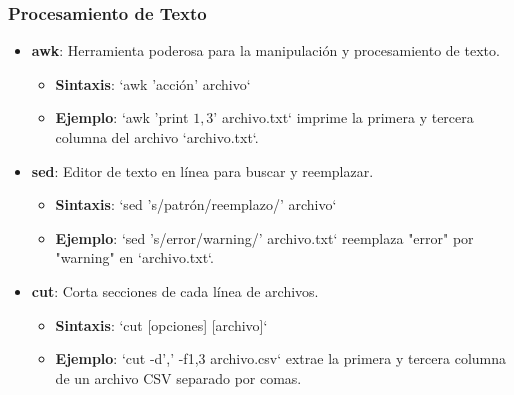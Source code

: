 \documentclass{beamer}
\begin{document}
\begin{frame}
\frametitle{Procesamiento de Texto}
\begin{itemize}
    \item \textbf{awk}: Herramienta poderosa para la manipulación y procesamiento de texto.
    \begin{itemize}
        \item \textbf{Sintaxis}: `awk '{acción}' archivo`
        \item \textbf{Ejemplo}: `awk '{print $1, $3}' archivo.txt` imprime la primera y tercera columna del archivo `archivo.txt`.
    \end{itemize}
    \item \textbf{sed}: Editor de texto en línea para buscar y reemplazar.
    \begin{itemize}
        \item \textbf{Sintaxis}: `sed 's/patrón/reemplazo/' archivo`
        \item \textbf{Ejemplo}: `sed 's/error/warning/' archivo.txt` reemplaza "error" por "warning" en `archivo.txt`.
    \end{itemize}
    \item \textbf{cut}: Corta secciones de cada línea de archivos.
    \begin{itemize}
        \item \textbf{Sintaxis}: `cut [opciones] [archivo]`
        \item \textbf{Ejemplo}: `cut -d',' -f1,3 archivo.csv` extrae la primera y tercera columna de un archivo CSV separado por comas.
    \end{itemize}
\end{itemize}
\end{frame}
\end{document}
